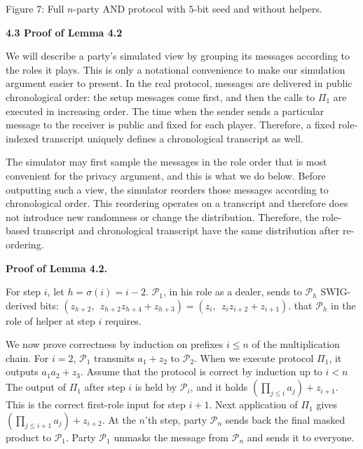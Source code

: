Figure 7: Full $n$-party AND protocol with $5$-bit seed and without helpers.




\par\medskip\noindent\textbf{
4.3 Proof of Lemma 4.2
}\par




We will describe a party’s simulated view by grouping its messages according to
the roles it plays. This is only a notational convenience to make our simulation argument easier to present. In the real protocol,
messages are delivered in public chronological order: the setup messages
come first, and then the calls to $\Pi_{1}$ are executed in increasing order. The time when the sender sends a particular message to the receiver is public and fixed for each player. Therefore, a fixed
role-indexed transcript uniquely defines a chronological transcript as well.\par




The simulator may first sample the messages in the role order that is most
convenient for the privacy argument, and this is what we do below. Before outputting such a view, the simulator
reorders those messages according to chronological order. This reordering operates on a transcript and therefore does not introduce new randomness or change the distribution. Therefore, the role-based transcript and chronological transcript have the same distribution after re-ordering.\par




\par\medskip\noindent\textbf{Proof of Lemma 4.2.}\par




For step $i$, let $h=\sigma(i)=i-2$. $\mathcal{P}_{1}$, in his role as a dealer, sends to
$\mathcal{P}_{h}$ SWIG-derived bits:
$(z_{h+2},\ \ z_{h+2}z_{h+4}+z_{h+3})=(z_{i},\ \ z_{i}z_{i+2}+z_{i+1}).$
that $\mathcal{P}_{h}$ in the role of helper at step $i$ requires.\par




We now prove correctness by induction on prefixes $i\leq n$ of the multiplication chain. For $i=2$, $\mathcal{P}_{1}$
transmits $a_{1}+z_{2}$ to $\mathcal{P}_{2}$. When we execute protocol $\Pi_{1}$, it outputs
$a_{1}a_{2}+z_{3}$. Assume that the protocol is correct by induction up to $i<n$ The
output of $\Pi_{1}$ after step $i$ is held by $\mathcal{P}_{i}$, and it holds
$\left(\prod_{j\leq i}a_{j}\right)+z_{i+1}$.
This is the correct first-role input for step $i+1$. Next application of
$\Pi_{1}$ gives
$\left(\prod_{j\leq i+1}a_{j}\right)+z_{i+2}$.
At the $n$’th step, party $\mathcal{P}_{n}$ sends back the final masked product to
$\mathcal{P}_{1}$. Party $\mathcal{P}_{1}$ unmasks the message from
$\mathcal{P}_{n}$ and sends it to everyone.\par




